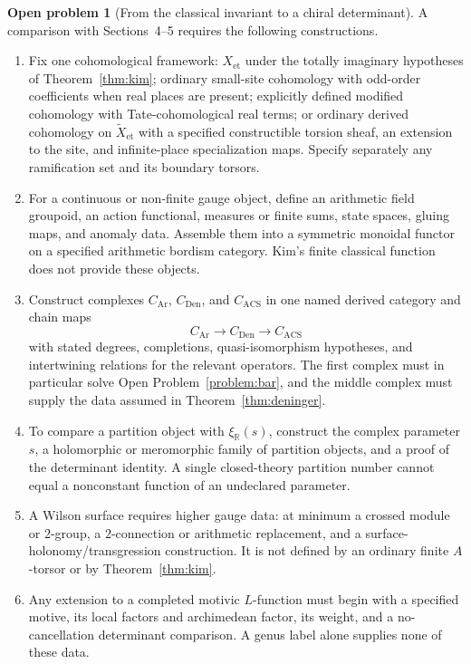 \documentclass[11pt]{article}
\theoremstyle{plain}
\theoremstyle{definition}
\newtheorem{openproblem}[theorem]{Open problem}
\theoremstyle{remark}
\begin{document}
\begin{openproblem}[From the classical invariant to a chiral determinant]
\label{problem:acs}
A comparison with Sections~4--5 requires the following constructions.

\begin{enumerate}
\item Fix one cohomological framework: \(X_{\mathrm{et}}\) under the totally
imaginary hypotheses of Theorem~\ref{thm:kim}; ordinary small-site
cohomology with odd-order coefficients when real places are present;
explicitly defined modified cohomology with Tate-cohomological real terms;
or ordinary derived cohomology on \(\widetilde X_{\mathrm{et}}\) with a
specified constructible torsion sheaf, an extension to the site, and
infinite-place specialization maps.  Specify separately any ramification
set and its boundary torsors.

\item For a continuous or non-finite gauge object, define an arithmetic
field groupoid, an action functional, measures or finite sums, state spaces,
gluing maps, and anomaly data.  Assemble them into a symmetric monoidal
functor on a specified arithmetic bordism category.  Kim's finite classical
function does not provide these objects.

\item Construct complexes \(C_{\mathrm{Ar}}\), \(C_{\mathrm{Den}}\), and
\(C_{\mathrm{ACS}}\) in one named derived category and chain maps
\[
 C_{\mathrm{Ar}}\longrightarrow C_{\mathrm{Den}}
 \longrightarrow C_{\mathrm{ACS}}
\]
with stated degrees, completions, quasi-isomorphism hypotheses, and
intertwining relations for the relevant operators.  The first complex must
in particular solve Open Problem~\ref{problem:bar}, and the middle complex
must supply the data assumed in Theorem~\ref{thm:deninger}.

\item To compare a partition object with \(\xi_{\mathbb R}(s)\), construct
the complex parameter \(s\), a holomorphic or meromorphic family of
partition objects, and a proof of the determinant identity.  A single
closed-theory partition number cannot equal a nonconstant function of an
undeclared parameter.

\item A Wilson surface requires higher gauge data: at minimum a crossed
module or \(2\)-group, a \(2\)-connection or arithmetic replacement, and a
surface-holonomy/transgression construction.  It is not defined by an
ordinary finite \(A\)-torsor or by Theorem~\ref{thm:kim}.

\item Any extension to a completed motivic \(L\)-function must begin with
a specified motive, its local factors and archimedean factor, its weight,
and a no-cancellation determinant comparison.  A genus label alone supplies
none of these data.
\end{enumerate}
\end{openproblem}
\end{document}
